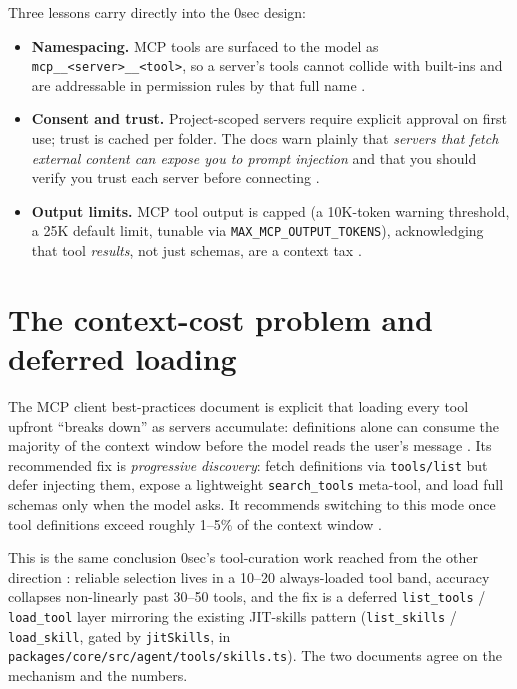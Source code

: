 \documentclass[11pt]{article}
\begin{document}
Three lessons carry directly into the 0sec design:
\begin{itemize}[leftmargin=*]
  \item \textbf{Namespacing.} MCP tools are surfaced to the model as
  \texttt{mcp\_\_<server>\_\_<tool>}, so a server's tools cannot collide with
  built-ins and are addressable in permission rules by that full name
  \cite{claudecode-mcp}.
  \item \textbf{Consent and trust.} Project-scoped servers require explicit
  approval on first use; trust is cached per folder. The docs warn plainly that
  \emph{servers that fetch external content can expose you to prompt injection}
  and that you should verify you trust each server before connecting
  \cite{claudecode-mcp}.
  \item \textbf{Output limits.} MCP tool output is capped (a 10K-token warning
  threshold, a 25K default limit, tunable via \texttt{MAX\_MCP\_OUTPUT\_TOKENS}),
  acknowledging that tool \emph{results}, not just schemas, are a context tax
  \cite{claudecode-mcp}.
\end{itemize}

\section{The context-cost problem and deferred loading}

The MCP client best-practices document is explicit that loading every tool
upfront ``breaks down'' as servers accumulate: definitions alone can consume the
majority of the context window before the model reads the user's message
\cite{mcp-clientbp}. Its recommended fix is \emph{progressive discovery}: fetch
definitions via \texttt{tools/list} but defer injecting them, expose a
lightweight \texttt{search\_tools} meta-tool, and load full schemas only when the
model asks. It recommends switching to this mode once tool definitions exceed
roughly 1--5\% of the context window \cite{mcp-clientbp}.

This is the same conclusion 0sec's tool-curation work reached from the other
direction \cite{tool-curation}: reliable selection lives in a 10--20 always-loaded
tool band, accuracy collapses non-linearly past 30--50 tools, and the fix is a
deferred \texttt{list\_tools} / \texttt{load\_tool} layer mirroring the existing
JIT-skills pattern (\texttt{list\_skills} / \texttt{load\_skill}, gated by
\texttt{jitSkills}, in \texttt{packages/core/src/agent/tools/skills.ts}). The two
documents agree on the mechanism and the numbers.
\end{document}
